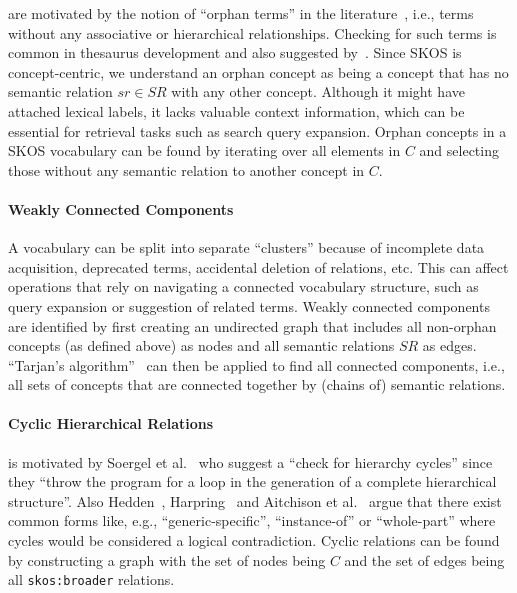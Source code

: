 are motivated by the notion of ``orphan terms'' in the literature~\cite{Hedden2010}, i.e., terms without any associative or hierarchical relationships. Checking for such terms is common in thesaurus development and also suggested by~\cite{Z39.19:2005}. Since SKOS is concept-centric, we understand an orphan concept as being a concept that has no semantic relation $sr \in SR$ with any other concept. Although it might have attached lexical labels, it lacks valuable context information, which can be essential for retrieval tasks such as search query expansion.
Orphan concepts in a SKOS vocabulary can be found by iterating over all elements in $C$ and selecting those without any semantic relation to another concept in $C$.

\paragraph{Weakly Connected Components}

A vocabulary can be split into separate ``clusters'' because of incomplete data acquisition, deprecated terms, accidental deletion of relations, etc. This can affect operations that rely on navigating a connected vocabulary structure, such as query expansion or suggestion of related terms.
Weakly connected components are identified by first creating an undirected graph that includes all non-orphan concepts (as defined above) as nodes and all semantic relations $SR$ as edges. ``Tarjan's algorithm''~\cite{Hopcroft1973} can then be applied to find all connected components, i.e., all sets of concepts that are connected together by (chains of) semantic relations.

\paragraph{Cyclic Hierarchical Relations}

is motivated by Soergel et al.~\cite{Soergel2002} who suggest a ``check for hierarchy cycles'' since they ``throw the program for a loop in the generation of a complete hierarchical structure''. Also Hedden~\cite{Hedden2010}, Harpring~\cite{Harpring2010} and Aitchison et al.~\cite{Aitchison2000} argue that there exist common forms like, e.g., ``generic-specific'', ``instance-of'' or ``whole-part'' where cycles would be considered a logical contradiction.
Cyclic relations can be found by constructing a graph with the set of nodes being $C$ and the set of edges being all \texttt{skos:broader} relations.

